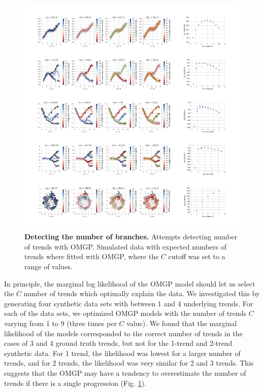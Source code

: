 \begin{figure}
    \centering
    \includegraphics[width=\textwidth]{"num-trends-rasterized"}
    \caption[Detecting the number of branches]{\textbf{Detecting the number of branches.} Attempts detecting number of trends with OMGP. Simulated data with expected numbers of trends where fitted with OMGP, where the \( C \) cutoff was set to a range of values.}
    \label{fig:numtrends}
\end{figure}

In principle, the marginal log likelihood of the OMGP model should let us select the $ C $ number of trends which optimally explain the data. We investigated this by generating four synthetic data sets with between 1 and 4 underlying trends. For each of the data sets, we optimized OMGP models with the number of trends $ C $ varying from 1 to 9 (three times per $ C $ value). We found that the marginal likelihood of the models corresponded to the correct number of trends in the cases of 3 and 4 ground truth trends, but not for the 1-trend and 2-trend synthetic data. For 1 trend, the likelihood was lowest for a larger number of trends, and for 2 trends, the likelihood was very similar for 2 and 3 trends. This suggests that the OMGP may have a tendency to overestimate the number of trends if there is a single progression (Fig. \ref{fig:numtrends}).

